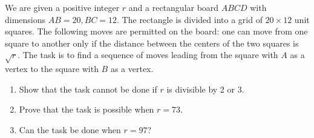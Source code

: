We are given a positive integer $ r$ and a rectangular board $ ABCD$ with dimensions $ AB = 20, BC = 12$. The rectangle is divided into a grid of $ 20 \times 12$ unit squares. The following moves are permitted on the board: one can move from one square to another only if the distance between the centers of the two squares is $ \sqrt {r}$. The task is to find a sequence of moves leading from the square with $ A$ as a vertex to the square with $ B$ as a vertex.

\begin{enumerate}[label = (\alph*)]
	\item Show that the task cannot be done if $ r$ is divisible by 2 or 3.
	\item Prove that the task is possible when $ r = 73$.
	\item Can the task be done when $ r = 97$?
\end{enumerate}
